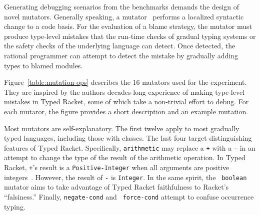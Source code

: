 Generating debugging scenarios from the benchmarks demands the design
of novel mutators. Generally speaking, a
mutator~\cite{jia2011analysis,demillo1978hints,lipton1971fault}
performs a localized syntactic change to a code basis. For the
evaluation of a blame strategy, the mutator must produce type-level
mistakes that the run-time checks of gradual typing systems or the
safety checks of the underlying language can detect. Once detected,
the rational programmer can attempt to detect the mistake by gradually
adding types to blamed modules.

Figure~\ref{table:mutation-ops} describes the 16 mutators used for the
experiment.  They are inspired by the authors decades-long experience
of making type-level mistakes in Typed Racket, some of which take a
non-trivial effort to debug.  For each mutaror, the figure provides a
short description and an example mutation.

Most mutators are self-explanatory.  The first twelve apply to most
gradually typed languages, including those with classes.  The last
four target distinguishing features of Typed Racket.  Specifically,
{\tt arithmetic} may replace a {\tt +} with a {\tt -} in an attempt to
change the type of the result of the arithmetic operation. In Typed
Racket, {\tt +}'s result is a {\tt Positive-Integer} when all
arguments are positive integers~\cite{stathff-padl-12}. However, the
result of {\tt -} is {\tt Integer}. In the same spirit, the {\tt
boolean} mutator aims to take advantage of Typed Racket faithfulness
to Racket's ``falsiness.'' Finally, {\tt negate-cond} and {\tt
force-cond} attempt to confuse occurrence typing.
